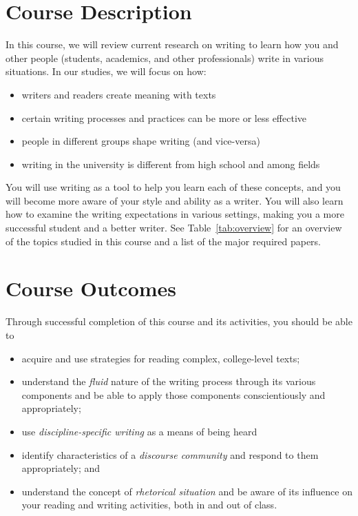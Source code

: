 \documentclass[11pt, twosides]{amsart}	%
\begin{document}
\section{Course Description} %
\label{sub:course_description}
In this course, we will review current research on writing to learn how you and other people (students, academics, and other professionals) write in various situations. In our studies, we will focus on how:
\begin{itemize}
	\item writers and readers create meaning with texts
	\item certain writing processes and practices can be more or less effective
	\item people in different groups shape writing (and vice-versa)
	\item writing in the university is different from high school and among fields
\end{itemize}
You will use writing as a tool to help you learn each of these concepts, and you will become more aware of your style and ability as a writer. You will also learn how to examine the writing expectations in various settings, making you a more successful student and a better writer. See Table~\ref{tab:overview} for an overview of the topics studied in this course and a list of the major required papers.



\section{Course Outcomes}\label{outcomes}
Through successful completion of this course and its activities, you should be able to
\begin{itemize}
	\item acquire and use strategies for reading complex, college-level texts;
	\item understand the \emph{fluid} nature of the writing process through its various components and be able to apply those components conscientiously and appropriately;
	\item use \emph{discipline-specific writing} as a means of being heard
	\item identify characteristics of a \emph{discourse community} and respond to them appropriately; and
	\item understand the concept of \emph{rhetorical situation} and be aware of its influence on your reading and writing activities, both in and out of class.
\end{itemize}
\end{document}
